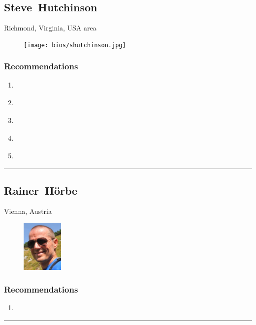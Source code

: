 \subsection{Steve~Hutchinson} \textsf{Richmond, Virginia, USA area} \par \setlength{\columnsep}{0pt} \begin{figure} \centering \texttt{[image: bios/shutchinson.jpg]} \end{figure}  \subsubsection{Recommendations}\begin{enumerate}
\item \cite{Birch2014}
\item \cite{Hardjono2016}
\item \cite{Nayyar2018}
\item \cite{Richer2017}
\item \cite{Schwartz2018}
\end{enumerate}\noindent\rule{\textwidth}{0.2pt}

\subsection{Rainer~Hörbe} \textsf{Vienna, Austria} \par \setlength{\columnsep}{0pt} \begin{figure} \centering \includegraphics[width=0.18\textwidth]{bios/r2h2.jpg} \end{figure}  \subsubsection{Recommendations}\begin{enumerate}
\item \cite{IAMPrimer2016}
\end{enumerate}\noindent\rule{\textwidth}{0.2pt}

